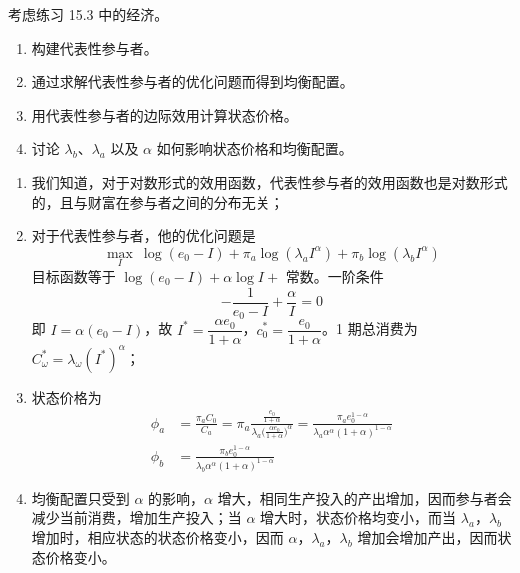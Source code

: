\begin{problem}
 考虑练习 15.3 中的经济。
\begin{enumerate}[label=(\alph*)]
    \item 构建代表性参与者。
    \item 通过求解代表性参与者的优化问题而得到均衡配置。
    \item 用代表性参与者的边际效用计算状态价格。
    \item 讨论 $\lambda_{b}$、$\lambda_{a}$ 以及 $\alpha$ 如何影响状态价格和均衡配置。
\end{enumerate}
\end{problem}
\begin{solution}
\begin{enumerate}[label=(\alph*)]
    \item 我们知道，对于对数形式的效用函数，代表性参与者的效用函数也是对数形式的，且与财富在参与者之间的分布无关；
    \item 对于代表性参与者，他的优化问题是
    \[
        \max_{I}\ \log(e_{0}-I)+\pi_{a}\log(\lambda_{a}I^{\alpha})+\pi_{b}\log(\lambda_{b}I^{\alpha})
    \]
    目标函数等于 $\log(e_{0}-I)+\alpha\log I+$ 常数。一阶条件
    \[
        -\frac{1}{e_{0}-I}+\frac{\alpha}{I}=0
    \]
    即 $I=\alpha(e_{0}-I)$，故 $I^{*}=\dfrac{\alpha e_{0}}{1+\alpha}$，$c_{0}^{*}=\dfrac{e_{0}}{1+\alpha}$。1 期总消费为 $C_{\omega}^{*}=\lambda_{\omega}(I^{*})^{\alpha}$；
    \item 状态价格为
    \[
        \begin{aligned}
            \phi_{a}&=\frac{\pi_{a}C_{0}}{C_{a}}=\pi_{a}\frac{\frac{e_{0}}{1+\alpha}}{\lambda_{a}\bigl(\frac{\alpha e_{0}}{1+\alpha}\bigr)^{\alpha}}=\frac{\pi_{a}e_{0}^{1-\alpha}}{\lambda_{a}\alpha^{\alpha}(1+\alpha)^{1-\alpha}}\\
            \phi_{b}&=\frac{\pi_{b}e_{0}^{1-\alpha}}{\lambda_{b}\alpha^{\alpha}(1+\alpha)^{1-\alpha}}
        \end{aligned}
    \]
    \item 均衡配置只受到 $\alpha$ 的影响，$\alpha$ 增大，相同生产投入的产出增加，因而参与者会减少当前消费，增加生产投入；当 $\alpha$ 增大时，状态价格均变小，而当 $\lambda_{a}$，$\lambda_{b}$ 增加时，相应状态的状态价格变小，因而 $\alpha$，$\lambda_{a}$，$\lambda_{b}$ 增加会增加产出，因而状态价格变小。
\end{enumerate}
\end{solution}


